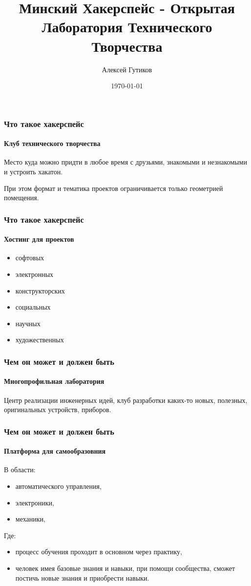 \documentclass{beamer}
\title[hackerspace.by]
{Минский Хакерспейс - Открытая Лаборатория Технического Творчества}
\author{Алексей Гутиков}
\date{\today}
\newif\ifplacelogo %
\begin{document}

\begin{frame}
\titlepage
\begin{center}
\end{center}
\end{frame}

\placelogotrue %

\begin {frame}
\frametitle {Что такое хакерспейс}
\framesubtitle {Клуб технического творчества}
Место куда можно придти в любое время с друзьями, знакомыми и незнакомыми и устроить хакатон. 

При этом формат и тематика проектов ограничивается только геометрией помещения.
\end {frame}


\begin {frame}
\frametitle {Что такое хакерспейс}
\framesubtitle {Хостинг для проектов}
\begin{itemize}
\item софтовых
\item электронных
\item конструкторских
\item социальных
\item научных
\item художественных
\end{itemize}
\end {frame}


\begin {frame}
\frametitle {Чем он может и должен быть}
\framesubtitle {Многопрофильная лаборатория}
Центр реализации инженерных идей, 
клуб разработки каких-то новых, полезных, оригинальных устройств, приборов.
\end {frame}


\begin {frame}
\frametitle {Чем он может и должен быть}
\framesubtitle {Платформа для самообразовния}
В области:
\begin{itemize}
\item автоматического управления, 
\item электроники, 
\item механики, 
\end{itemize}
Где:
\begin{itemize}
\item процесс обучения проходит в основном через практику,
\item человек имея базовые знания и навыки, при помощи сообщества, сможет постичь новые знания и приобрести навыки.
\end{itemize}
\end {frame}
\end{document}
